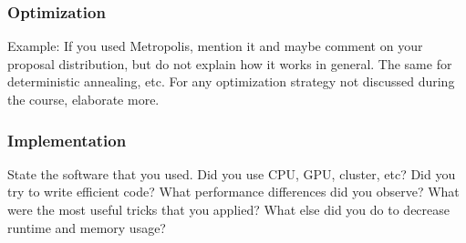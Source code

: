 \documentclass{beamer}
\begin{document}
\begin{frame}
\frametitle{Optimization}

Example: If you used Metropolis, mention it and maybe comment on your proposal distribution, but do not explain how it works in general. The same for deterministic annealing, etc. For any optimization strategy not discussed during the course, elaborate more.


\end{frame}


\begin{frame}[fragile]
\frametitle{Implementation}
State the software that you used. Did you use CPU, GPU, cluster, etc? Did you try to write efficient code? What performance differences did you observe? What were the most useful tricks that you applied? What else did you do to decrease runtime and memory usage?

\end{frame}
\end{document}
